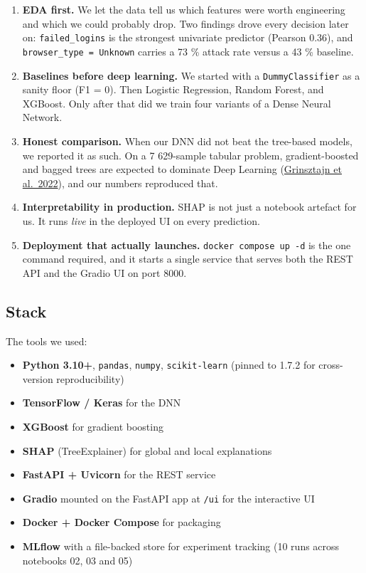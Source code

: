 \begin{enumerate}
\def\labelenumi{\arabic{enumi}.}
\tightlist
\item
  \textbf{EDA first.} We let the data tell us which features were worth
  engineering and which we could probably drop. Two findings drove every
  decision later on: \texttt{failed\_logins} is the strongest univariate
  predictor (Pearson 0.36), and \texttt{browser\_type\ =\ Unknown}
  carries a 73 \% attack rate versus a 43 \% baseline.
\item
  \textbf{Baselines before deep learning.} We started with a
  \texttt{DummyClassifier} as a sanity floor (F1 = 0). Then Logistic
  Regression, Random Forest, and XGBoost. Only after that did we train
  four variants of a Dense Neural Network.
\item
  \textbf{Honest comparison.} When our DNN did not beat the tree-based
  models, we reported it as such. On a 7 629-sample tabular problem,
  gradient-boosted and bagged trees are expected to dominate Deep
  Learning (\href{https://arxiv.org/abs/2207.08815}{Grinsztajn et
  al.~2022}), and our numbers reproduced that.
\item
  \textbf{Interpretability in production.} SHAP is not just a notebook
  artefact for us. It runs \emph{live} in the deployed UI on every
  prediction.
\item
  \textbf{Deployment that actually launches.}
  \texttt{docker\ compose\ up\ -d} is the one command required, and it
  starts a single service that serves both the REST API and the Gradio
  UI on port 8000.
\end{enumerate}

\subsection{Stack}\label{stack}

The tools we used:

\begin{itemize}
\tightlist
\item
  \textbf{Python 3.10+}, \texttt{pandas}, \texttt{numpy},
  \texttt{scikit-learn} (pinned to 1.7.2 for cross-version
  reproducibility)
\item
  \textbf{TensorFlow / Keras} for the DNN
\item
  \textbf{XGBoost} for gradient boosting
\item
  \textbf{SHAP} (TreeExplainer) for global and local explanations
\item
  \textbf{FastAPI + Uvicorn} for the REST service
\item
  \textbf{Gradio} mounted on the FastAPI app at \texttt{/ui} for the
  interactive UI
\item
  \textbf{Docker + Docker Compose} for packaging
\item
  \textbf{MLflow} with a file-backed store for experiment tracking (10
  runs across notebooks 02, 03 and 05)
\end{itemize}

